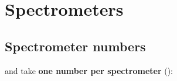 \chapter{\texorpdfstring{Spectrometers}{Spectrometers}}\label{user_manual-06u5fspectrometers}
\section{\texorpdfstring{Spectrometer numbers}{Spectrometer numbers}}\label{user_manual-06u5fspectrometers:61-spectrometer-numbers}
\hyperref[param:electronu5farm]{} and \hyperref[param:hadronu5farm]{} take \textbf{one number per spectrometer} ():

